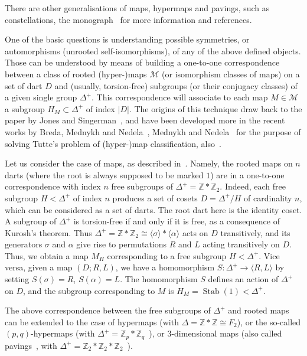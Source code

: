 \documentclass[ALCO,ThmDefs,Unicode,epreuves]{cedram}
\DeclareMathOperator{\Stab}{Stab}
\begin{document}
There are other generalisations of maps, hypermaps and pavings, such as constellations, %
\cf the monograph~\cite{LZ} for more information and references. 

One of the basic questions is understanding possible symmetries, or automorphisms (\ie unrooted self-isomorphisms), of any of the above defined objects. Those can be understood by means of building a one-to-one correspondence between a class of rooted (hyper-)maps $\mathcal{M}$ (or isomorphism classes of maps) on a set of dart $D$ and (usually, torsion-free) subgroups (or their conjugacy classes) of a given single group $\Delta^+$. This correspondence will associate to each map $M \in \mathcal{M}$ a subgroup $H_M \subset \Delta^+$ of index $|D|$. The origins of this technique draw back to the paper by Jones and Singerman~\cite{JoSi}, and have been developed more in the recent works by Breda, Mednykh and Nedela~\cite{BrMeNe}, Mednykh and Nedela~\cite{MN1, MN2} for the purpose of solving Tutte's problem of (hyper-)map classification, %
\cf also~\cite{CK2, CK1}.

Let us consider the case of maps, as described in~\cite{BrMeNe, JoSi}. Namely, the rooted maps on $n$ darts (where the root is always supposed to be marked $1$) are in a one-to-one correspondence with index $n$ free subgroups of $\Delta^+ = \mathbb{Z}*\mathbb{Z}_2$. Indeed, each free subgroup $H < \Delta^+$ of index $n$ produces a set of cosets $D = \Delta^+ / H$ of cardinality $n$, which can be considered as a set of darts. The root dart here is the identity coset. A subgroup of $\Delta^+$ is torsion-free if and only if it is free, as a consequence of Kurosh's theorem. Thus $\Delta^+ = \mathbb{Z}*\mathbb{Z}_2 \cong \langle \sigma \rangle * \langle \alpha \rangle$ acts on $D$ transitively, and its generators $\sigma$ and $\alpha$ give rise to permutations $R$ and $L$ acting transitively on $D$. Thus, we obtain a map $M_H$ corresponding to a free subgroup $H < \Delta^+$. Vice versa, given a map $( D; R, L )$, we have a homomorphism $S: \Delta^+ \rightarrow \langle R, L \rangle$ by setting $S(\sigma) = R$, $S(\alpha) = L$. The homomorphism $S$ defines an action of $\Delta^+$ on $D$, and the subgroup corresponding to $M$ is $H_M = \Stab(1) < \Delta^+$. 

The above correspondence between the free subgroups of $\Delta^+$ and rooted maps can be extended to the case of hypermaps (with $\Delta = \mathbb{Z}*\mathbb{Z} \cong F_2$), or the so-called $(p,q)$-hypermaps (with $\Delta^+ = \mathbb{Z}_p*\mathbb{Z}_q$~\cite{CK1}), or $3$-dimensional maps (also called pavings~\cite{AK, Spehner}, with $\Delta^+ = \mathbb{Z}_2*\mathbb{Z}_2*\mathbb{Z}_2$~\cite{CK2}). 
\end{document}
